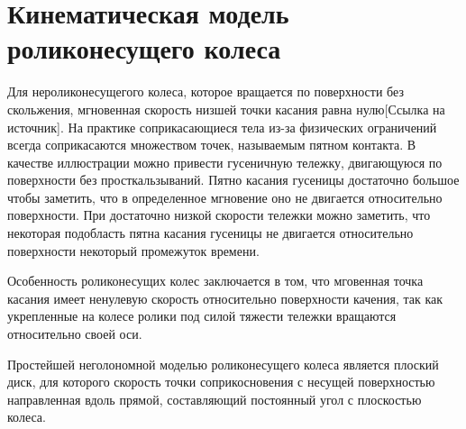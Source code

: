 \documentclass[oneside,final,14pt]{extreport}
\newcommand{\cmmnt}[1]{\ignorespaces}
\begin{document}
\chapter{Кинематическая модель роликонесущего колеса} 
Для нероликонесущегого колеса, которое вращается по поверхности без скольжения, мгновенная скорость низшей точки касания равна нулю[Ссылка на источник]. На практике соприкасающиеся тела из-за физических ограничений всегда соприкасаются множеством точек, называемым пятном контакта. В качестве иллюстрации можно привести гусеничную тележку, двигающуюся по поверхности без просткальзываний. Пятно касания гусеницы достаточно большое чтобы заметить, что в определенное мгновение оно не двигается относительно поверхности. При достаточно низкой скорости тележки можно заметить, что некоторая подобласть пятна касания гусеницы не двигается относительно поверхности некоторый промежуток времени. 

Особенность роликонесущих колес заключается в том, что мговенная точка касания имеет ненулевую скорость относительно поверхности качения, так как укрепленные на колесе ролики под силой тяжести тележки вращаются относительно своей оси. \cmmnt{В случае всенаправленного колеса, оси роликов которого параллельны плоскости диска колеса, проскальзывания не происходит, что упрощает процесс построения математической модели}

 Простейшей неголономной моделью роликонесущего колеса является плоский диск, для которого скорость точки соприкосновения с несущей поверхностью направленная вдоль прямой, составляющий постоянный угол с плоскостью колеса.

\begin{figure}[H]
\end{figure}

\begin{figure}[H]
\end{figure}
\end{document}
